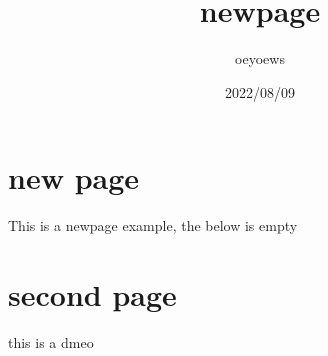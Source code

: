 \documentclass{article}
\title{newpage}
\author{oeyoews}
\date{2022/08/09}
\begin{document}
\maketitle


\section{new page}%
\label{sec:new page}

This is a newpage example, the below is empty

\newpage

\section{second page}
\label{sec:second page}

this is a dmeo
\end{document}
